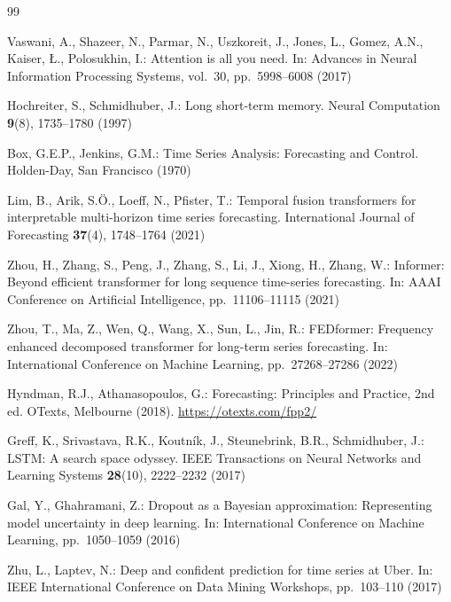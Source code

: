 \documentclass[runningheads]{llncs}
\begin{document}
\begin{thebibliography}{99}

Vaswani, A., Shazeer, N., Parmar, N., Uszkoreit, J., Jones, L., Gomez, A.N., Kaiser, Ł., Polosukhin, I.:
Attention is all you need.
In: Advances in Neural Information Processing Systems, vol.~30, pp.~5998--6008 (2017)

Hochreiter, S., Schmidhuber, J.:
Long short-term memory.
Neural Computation \textbf{9}(8), 1735--1780 (1997)

Box, G.E.P., Jenkins, G.M.:
Time Series Analysis: Forecasting and Control.
Holden-Day, San Francisco (1970)

Lim, B., Arik, S.Ö., Loeff, N., Pfister, T.:
Temporal fusion transformers for interpretable multi-horizon time series forecasting.
International Journal of Forecasting \textbf{37}(4), 1748--1764 (2021)

Zhou, H., Zhang, S., Peng, J., Zhang, S., Li, J., Xiong, H., Zhang, W.:
Informer: Beyond efficient transformer for long sequence time-series forecasting.
In: AAAI Conference on Artificial Intelligence, pp.~11106--11115 (2021)

Zhou, T., Ma, Z., Wen, Q., Wang, X., Sun, L., Jin, R.:
FEDformer: Frequency enhanced decomposed transformer for long-term series forecasting.
In: International Conference on Machine Learning, pp.~27268--27286 (2022)

Hyndman, R.J., Athanasopoulos, G.:
Forecasting: Principles and Practice, 2nd ed.
OTexts, Melbourne (2018). \url{https://otexts.com/fpp2/}

Greff, K., Srivastava, R.K., Koutník, J., Steunebrink, B.R., Schmidhuber, J.:
LSTM: A search space odyssey.
IEEE Transactions on Neural Networks and Learning Systems \textbf{28}(10), 2222--2232 (2017)

Gal, Y., Ghahramani, Z.:
Dropout as a Bayesian approximation: Representing model uncertainty in deep learning.
In: International Conference on Machine Learning, pp.~1050--1059 (2016)

Zhu, L., Laptev, N.:
Deep and confident prediction for time series at Uber.
In: IEEE International Conference on Data Mining Workshops, pp.~103--110 (2017)


\end{thebibliography}
\end{document}
